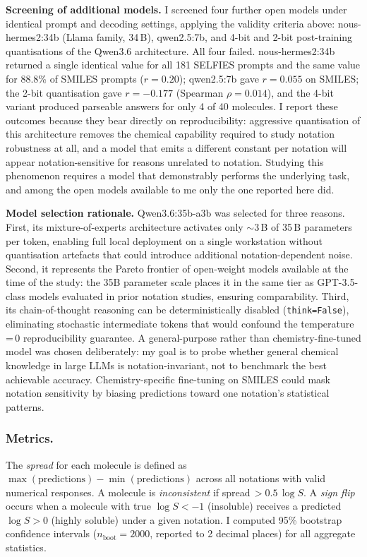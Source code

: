 \documentclass[twoside,twocolumn,9pt]{article}
\newcommand{\logS}{\ensuremath{\log S}}
\begin{document}
\textbf{Screening of additional models.} I screened four further open models under identical prompt and decoding settings, applying the validity criteria above: nous-hermes2:34b (Llama family, 34\,B), qwen2.5:7b, and 4-bit and 2-bit post-training quantisations of the Qwen3.6 architecture. All four failed. nous-hermes2:34b returned a single identical value for all 181 SELFIES prompts and the same value for 88.8\% of SMILES prompts ($r=0.20$); qwen2.5:7b gave $r=0.055$ on SMILES; the 2-bit quantisation gave $r=-0.177$ (Spearman $\rho=0.014$), and the 4-bit variant produced parseable answers for only 4 of 40 molecules. I report these outcomes because they bear directly on reproducibility: aggressive quantisation of this architecture removes the chemical capability required to study notation robustness at all, and a model that emits a different constant per notation will appear notation-sensitive for reasons unrelated to notation. Studying this phenomenon requires a model that demonstrably performs the underlying task, and among the open models available to me only the one reported here did.

\textbf{Model selection rationale.} Qwen3.6:35b-a3b was selected for three reasons. First, its mixture-of-experts architecture activates only $\sim$3\,B of 35\,B parameters per token, enabling full local deployment on a single workstation without quantisation artefacts that could introduce additional notation-dependent noise. Second, it represents the Pareto frontier of open-weight models available at the time of the study: the 35B parameter scale places it in the same tier as GPT-3.5-class models evaluated in prior notation studies,\cite{yan2025} ensuring comparability. Third, its chain-of-thought reasoning can be deterministically disabled (\texttt{think=False}), eliminating stochastic intermediate tokens that would confound the temperature\,=\,0 reproducibility guarantee. A general-purpose rather than chemistry-fine-tuned model was chosen deliberately: my goal is to probe whether general chemical knowledge in large LLMs is notation-invariant, not to benchmark the best achievable accuracy. Chemistry-specific fine-tuning on SMILES could mask notation sensitivity by biasing predictions toward one notation's statistical patterns.

\subsubsection{Metrics.~~} The \textit{spread} for each molecule is defined as $\max(\text{predictions}) - \min(\text{predictions})$ across all notations with valid numerical responses. A molecule is \textit{inconsistent} if spread\,$>0.5$\,$\logS$. A \textit{sign flip} occurs when a molecule with true $\logS < -1$ (insoluble) receives a predicted $\logS > 0$ (highly soluble) under a given notation. I computed 95\% bootstrap confidence intervals ($n_\text{boot}=2000$, reported to 2 decimal places) for all aggregate statistics.
\end{document}
